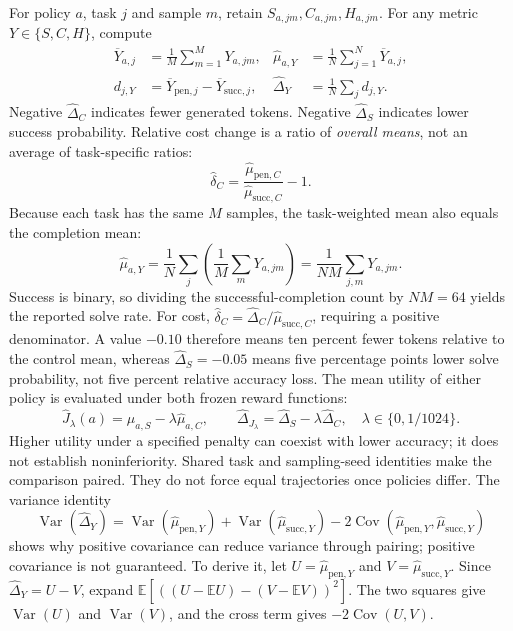 \documentclass[11pt]{article}
\newcommand{\E}{\mathbb{E}}
\newcommand{\Var}{\operatorname{Var}}
\newcommand{\Cov}{\operatorname{Cov}}
\begin{document}
For policy $a$, task $j$ and sample $m$, retain $S_{a,jm},C_{a,jm},H_{a,jm}$. For any metric $Y\in\{S,C,H\}$, compute
\begin{align}
 \overline Y_{a,j}&=\frac1M\sum_{m=1}^{M}Y_{a,jm},&
 \widehat\mu_{a,Y}&=\frac1N\sum_{j=1}^{N}\overline Y_{a,j},\\
 d_{j,Y}&=\overline Y_{\mathrm{pen},j}-\overline Y_{\mathrm{succ},j},&
 \widehat\Delta_Y&=\frac1N\sum_jd_{j,Y}.\label{eq:pairedmeans}
\end{align}
Negative $\widehat\Delta_C$ indicates fewer generated tokens. Negative $\widehat\Delta_S$ indicates lower success probability. Relative cost change is a ratio of \emph{overall means}, not an average of task-specific ratios:
\begin{equation}
 \widehat\delta_C=\frac{\widehat\mu_{\mathrm{pen},C}}
                          {\widehat\mu_{\mathrm{succ},C}}-1.
\end{equation}
Because each task has the same $M$ samples, the task-weighted mean also equals the completion mean:
\begin{equation}
 \widehat\mu_{a,Y}=\frac1N\sum_j\left(\frac1M\sum_mY_{a,jm}\right)
                  =\frac1{NM}\sum_{j,m}Y_{a,jm}.
\end{equation}
Success is binary, so dividing the successful-completion count by $NM=64$ yields the reported solve rate. For cost, $\widehat\delta_C=\widehat\Delta_C/\widehat\mu_{\mathrm{succ},C}$, requiring a positive denominator. A value $-0.10$ therefore means ten percent fewer tokens relative to the control mean, whereas $\widehat\Delta_S=-0.05$ means five percentage points lower solve probability, not five percent relative accuracy loss.
The mean utility of either policy is evaluated under both frozen reward functions:
\begin{equation}
 \widehat J_\lambda(a)=\widehat\mu_{a,S}-\lambda\widehat\mu_{a,C},
 \qquad \widehat\Delta_{J_\lambda}=\widehat\Delta_S-\lambda\widehat\Delta_C,
 \quad\lambda\in\{0,1/1024\}.
\end{equation}
Higher utility under a specified penalty can coexist with lower accuracy; it does not establish noninferiority. Shared task and sampling-seed identities make the comparison paired. They do not force equal trajectories once policies differ. The variance identity
\begin{equation}
 \Var(\widehat\Delta_Y)=\Var(\widehat\mu_{\mathrm{pen},Y})
 +\Var(\widehat\mu_{\mathrm{succ},Y})
 -2\Cov(\widehat\mu_{\mathrm{pen},Y},\widehat\mu_{\mathrm{succ},Y})
\end{equation}
shows why positive covariance can reduce variance through pairing; positive covariance is not guaranteed.
To derive it, let $U=\widehat\mu_{\mathrm{pen},Y}$ and $V=\widehat\mu_{\mathrm{succ},Y}$. Since $\widehat\Delta_Y=U-V$, expand $\E[((U-\E U)-(V-\E V))^2]$. The two squares give $\Var(U)$ and $\Var(V)$, and the cross term gives $-2\Cov(U,V)$.
\end{document}
